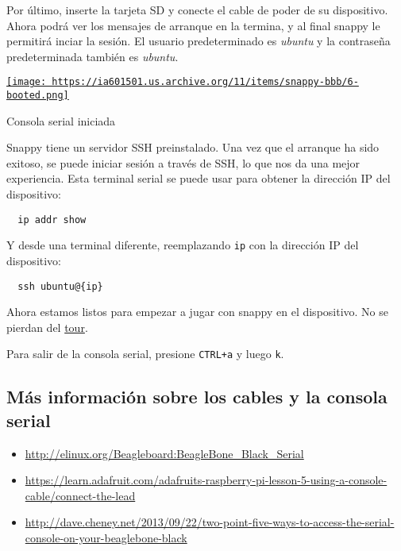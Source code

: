 \documentclass[12pt]{article}
\begin{document}
Por último, inserte la tarjeta SD y conecte el cable de poder de su
dispositivo. Ahora podrá ver los mensajes de arranque en la termina, y al final
snappy le permitirá inciar la sesión. El usuario predeterminado es
\emph{ubuntu} y la contraseña predeterminada también es \emph{ubuntu}.

\begin{center}
  \href{
    https://ia601501.us.archive.org/11/items/snappy-bbb/6-booted.png}{
    \texttt{[image: 
      https://ia601501.us.archive.org/11/items/snappy-bbb/6-booted.png]}
  }
  \caption{Consola serial iniciada}
\end{center}

Snappy tiene un servidor SSH preinstalado. Una vez que el arranque ha sido
exitoso, se puede iniciar sesión a través de SSH, lo que nos da una mejor
experiencia. Esta terminal serial se puede usar para obtener la dirección IP
del dispositivo:

\begin{verbatim}
  ip addr show
\end{verbatim}

Y desde una terminal diferente, reemplazando \verb$ip$ con la dirección IP del
dispositivo:

\begin{verbatim}
  ssh ubuntu@{ip}
\end{verbatim}

Ahora estamos listos para empezar a jugar con snappy en el dispositivo. No se
pierdan del
\href{https://developer.ubuntu.com/en/snappy/tutorials/using-snappy/}{tour}.

Para salir de la consola serial, presione \verb$CTRL+a$ y luego \verb$k$.

\subsection{Más información sobre los cables y la consola serial}

\begin{itemize}
  \item \url{http://elinux.org/Beagleboard:BeagleBone_Black_Serial}
  \item \url{https://learn.adafruit.com/adafruits-raspberry-pi-lesson-5-using-a-console-cable/connect-the-lead}
  \item \url{http://dave.cheney.net/2013/09/22/two-point-five-ways-to-access-the-serial-console-on-your-beaglebone-black}
\end{itemize}
\end{document}

